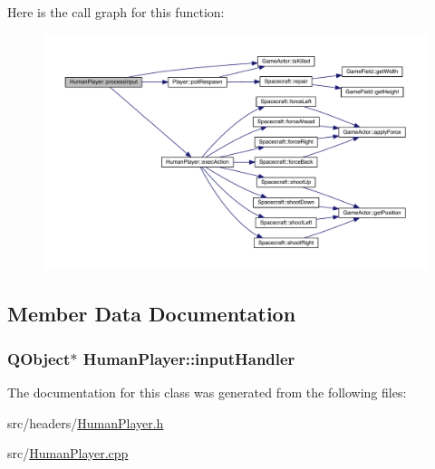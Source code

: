 Here is the call graph for this function\+:\nopagebreak
\begin{figure}[H]
\begin{center}
\leavevmode
\includegraphics[width=350pt]{class_human_player_a4298cb4a77be8ef79cc289baec199602_cgraph}
\end{center}
\end{figure}




\subsection{Member Data Documentation}
\hypertarget{class_human_player_afac1bdc1194ebbd2236d0df12a1fb341}{
\subsubsection[{input\+Handler}]{\setlength{\rightskip}{0pt plus 5cm}Q\+Object$\ast$ Human\+Player\+::input\+Handler\hspace{0.3cm}{\ttfamily [protected]}}}\label{class_human_player_afac1bdc1194ebbd2236d0df12a1fb341}


The documentation for this class was generated from the following files\+:\begin{DoxyCompactItemize}
\item 
src/headers/\hyperlink{_human_player_8h}{Human\+Player.\+h}\item 
src/\hyperlink{_human_player_8cpp}{Human\+Player.\+cpp}\end{DoxyCompactItemize}
